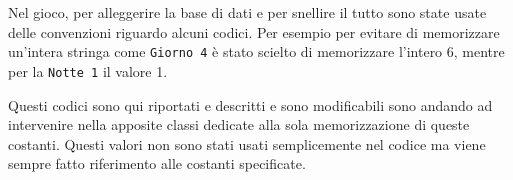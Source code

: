 Nel gioco, per alleggerire la base di dati e per snellire il tutto sono state usate delle convenzioni riguardo alcuni codici. Per esempio per evitare di memorizzare un'intera stringa come \texttt{Giorno 4} è stato scielto di memorizzare l'intero 6, mentre per la \texttt{Notte 1} il valore 1.

Questi codici sono qui riportati e descritti e sono modificabili sono andando ad intervenire nella apposite classi dedicate alla sola memorizzazione di queste costanti. Questi valori non sono stati usati semplicemente nel codice ma viene sempre fatto riferimento alle costanti specificate.
